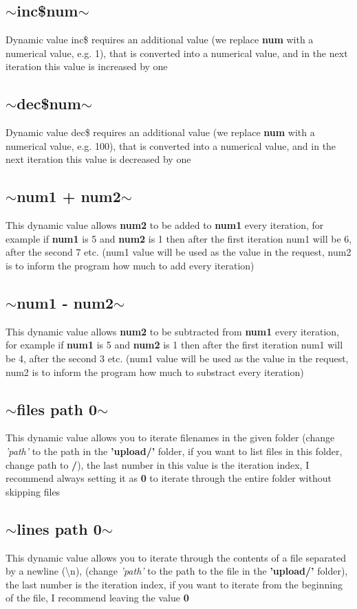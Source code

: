 \documentclass{article}
\begin{document}
\subsection{$\sim$inc\$num$\sim$}
Dynamic value inc\$ requires an additional value (we replace \textbf{num} with a numerical value, e.g. 1), that is converted into a numerical value, and in the next iteration this value is increased by one
\subsection{$\sim$dec\$num$\sim$}
Dynamic value dec\$ requires an additional value (we replace \textbf{num} with a numerical value, e.g. 100), that is converted into a numerical value, and in the next iteration this value is decreased by one
\subsection{$\sim$num1 + num2$\sim$}
This dynamic value allows \textbf{num2} to be added to \textbf{num1} every iteration, for example if \textbf{num1} is 5 and \textbf{num2} is 1 then after the first iteration num1 will be 6, after the second 7 etc. (num1 value will be used as the value in the request, num2 is to inform the program how much to add every iteration)
\subsection{$\sim$num1 - num2$\sim$}
This dynamic value allows \textbf{num2} to be subtracted from \textbf{num1} every iteration, for example if \textbf{num1} is 5 and \textbf{num2} is 1 then after the first iteration num1 will be 4, after the second 3 etc. (num1 value will be used as the value in the request, num2 is to inform the program how much to substract every iteration)
\subsection{$\sim$files path 0$\sim$}
This dynamic value allows you to iterate filenames in the given folder (change \textit{'path'} to the path in the \textbf{'upload/'} folder, if you want to list files in this folder, change path to \textbf{/}), the last number in this value is the iteration index, I recommend always setting it as \textbf{0} to iterate through the entire folder without skipping files
\subsection{$\sim$lines path 0$\sim$}
This dynamic value allows you to iterate through the contents of a file separated by a newline (\textbackslash n), (change \textit{'path'} to the path to the file in the \textbf{'upload/'} folder), the last number is the iteration index, if you want to iterate from the beginning of the file, I recommend leaving the value \textbf{0}
\end{document}
